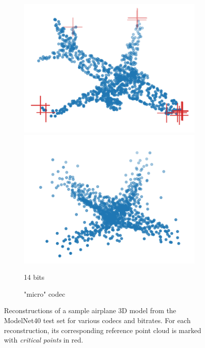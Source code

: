 \begin{figure}[t]
\begin{subfigure}[b]{\subfigureouterhspace}
\begin{subsubfigure}[b]{\subfigurehspace}
      \includegraphics[width=\linewidth]{img/point_cloud_compression/crit/test_airplane_0630/micro_1.pdf}
      \includegraphics[width=\linewidth]{img/point_cloud_compression/rec/test_airplane_0630/micro_1.pdf}
      \caption{14 bits}
      \label{fig:rec/micro/1}
    \end{subsubfigure}%
    \caption{"micro" codec}
  \end{subfigure}%
  \caption{
    Reconstructions of a sample airplane 3D model from the ModelNet40 test set for various codecs and bitrates.
    For each reconstruction, its corresponding reference point cloud is marked with \emph{critical points} in red.
  }
  \label{fig:rec}
\end{figure}



